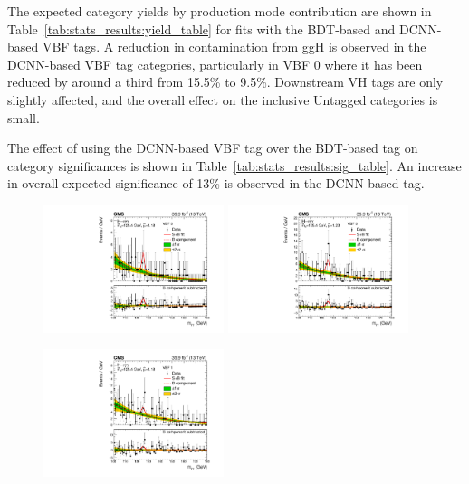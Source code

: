 The expected category yields by production mode contribution are shown in Table~\ref{tab:stats_results:yield_table} for fits with the BDT-based and DCNN-based VBF tags. 
A reduction in contamination from ggH is observed in the DCNN-based VBF tag categories, particularly in VBF 0 where it has been reduced by around a third from 15.5\% to 9.5\%. 
Downstream VH tags are only slightly affected, and the overall effect on the inclusive Untagged categories is small. 

The effect of using the DCNN-based VBF tag over the BDT-based tag on category significances is shown in Table~\ref{tab:stats_results:sig_table}.
An increase in overall expected significance of 13\% is observed in the DCNN-based tag. 
\newpage
\begin{figure}[h!]
    \begin{center}
        \includegraphics[width=0.47\textwidth]{figures/stats_results/CMS-HIG-16-040_Figure_012-a.pdf}
        \includegraphics[width=0.47\textwidth]{figures/stats_results/SBplots_jackWSnewVBFTag_0_13TeV.pdf}
    \end{center}
    \begin{center}
        \includegraphics[width=0.47\textwidth]{figures/stats_results/CMS-HIG-16-040_Figure_012-b.pdf}

\end{center}
\end{figure}
